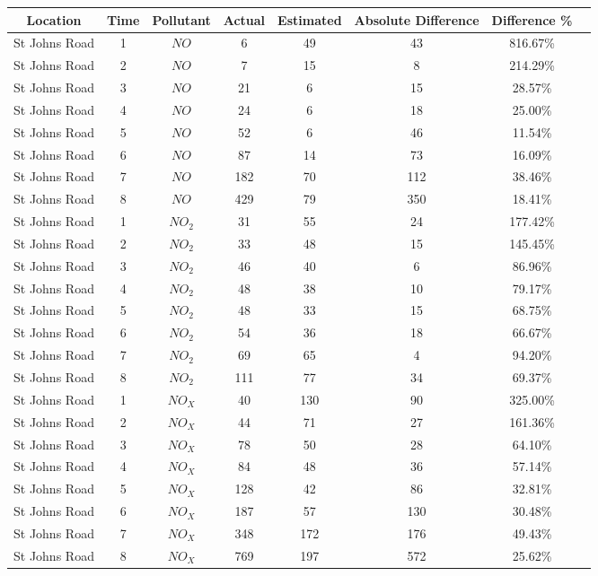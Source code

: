 			\begin{longtable}{|c|c|c|c|c|c|c|c|}
				\hline
				Location & Time & Pollutant & Actual & Estimated & Absolute Difference & Difference \% \\
				\hline
				\endhead
				\hline %
				\endfoot
				St Johns Road & 1 & $NO$ & 6 & 49 & 43 & 816.67\% \\
				St Johns Road & 2 & $NO$ & 7 & 15 & 8 & 214.29\% \\
				St Johns Road & 3 & $NO$ & 21 & 6 & 15 & 28.57\% \\
				St Johns Road & 4 & $NO$ & 24 & 6 & 18 & 25.00\% \\
				St Johns Road & 5 & $NO$ & 52 & 6 & 46 & 11.54\% \\
				St Johns Road & 6 & $NO$ & 87 & 14 & 73 & 16.09\% \\
				St Johns Road & 7 & $NO$ & 182 & 70 & 112 & 38.46\% \\
				St Johns Road & 8 & $NO$ & 429 & 79 & 350 & 18.41\% \\
				St Johns Road & 1 & $NO_{2}$ & 31 & 55 & 24 & 177.42\% \\
				St Johns Road & 2 & $NO_{2}$ & 33 & 48 & 15 & 145.45\% \\
				St Johns Road & 3 & $NO_{2}$ & 46 & 40 & 6 & 86.96\% \\
				St Johns Road & 4 & $NO_{2}$ & 48 & 38 & 10 & 79.17\% \\
				St Johns Road & 5 & $NO_{2}$ & 48 & 33 & 15 & 68.75\% \\
				St Johns Road & 6 & $NO_{2}$ & 54 & 36 & 18 & 66.67\% \\
				St Johns Road & 7 & $NO_{2}$ & 69 & 65 & 4 & 94.20\% \\
				St Johns Road & 8 & $NO_{2}$ & 111 & 77 & 34 & 69.37\% \\
				St Johns Road & 1 & $NO_{X}$ & 40 & 130 & 90 & 325.00\% \\
				St Johns Road & 2 & $NO_{X}$ & 44 & 71 & 27 & 161.36\% \\
				St Johns Road & 3 & $NO_{X}$ & 78 & 50 & 28 & 64.10\% \\
				St Johns Road & 4 & $NO_{X}$ & 84 & 48 & 36 & 57.14\% \\
				St Johns Road & 5 & $NO_{X}$ & 128 & 42 & 86 & 32.81\% \\
				St Johns Road & 6 & $NO_{X}$ & 187 & 57 & 130 & 30.48\% \\
				St Johns Road & 7 & $NO_{X}$ & 348 & 172 & 176 & 49.43\% \\
				St Johns Road & 8 & $NO_{X}$ & 769 & 197 & 572 & 25.62\% \\

\end{longtable}
